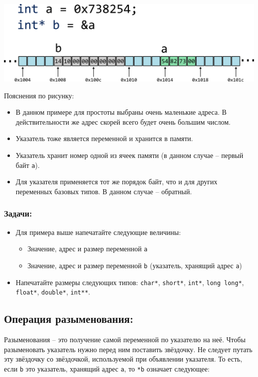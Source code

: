 \documentclass{article}
\begin{document}
\begin{center}
\includegraphics[scale=1]{../images/memory/memory_3_pointer_to_int_b.png}
\end{center}
Пояснения по рисунку:
\begin{itemize}
\item В данном примере для простоты выбраны очень маленькие адреса. В действительности же адрес скорей всего будет очень большим числом.
\item Указатель тоже является переменной и хранится в памяти.
\item Указатель хранит номер одной из ячеек памяти (в данном случае -- первый байт \texttt{a}).
\item Для указателя применяется тот же порядок байт, что и для других переменных базовых типов. В данном случае -- обратный.
\end{itemize}

\subsubsection*{Задачи:}
\begin{itemize}
\item Для примера выше напечатайте следующие величины: 
\begin{itemize}
\item Значение, адрес и размер переменной \texttt{a}
\item Значение, адрес и размер переменной \texttt{b} (указатель, хранящий адрес \texttt{a})
\end{itemize}
\item Напечатайте размеры следующих типов: \texttt{char*}, \texttt{short*}, \texttt{int*}, \texttt{long long*}, \texttt{float*}, \texttt{double*}, \texttt{int**}.
\end{itemize}



\subsection*{Операция разыменования:}
Разыменования -- это получение самой переменной по указателю на неё. Чтобы разыменовать указатель нужно перед ним поставить звёздочку. Не следует путать эту звёздочку со звёздочкой, используемой при объявлении указателя. То есть, если \texttt{b} это указатель, хранящий адрес \texttt{a}, то \texttt{*b} означает следующее:\\
\end{document}
